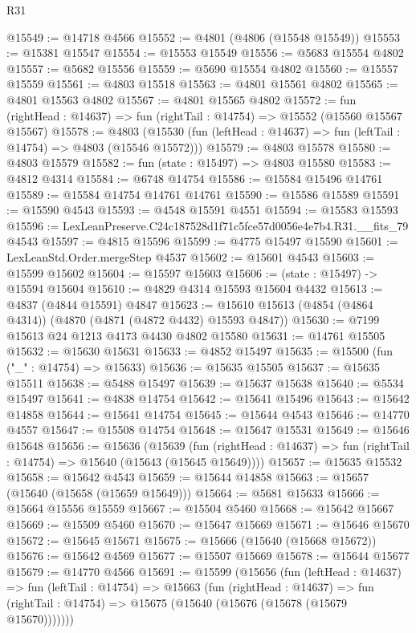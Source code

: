 \begin{lexlean}{R31}
\begin{coremodule}
@15549 := @14718 @4566
@15552 := @4801 (@4806 (@15548 @15549))
@15553 := @15381 @15547
@15554 := @15553 @15549
@15556 := @5683 @15554 @4802
@15557 := @5682 @15556
@15559 := @5690 @15554 @4802
@15560 := @15557 @15559
@15561 := @4803 @15518
@15563 := @4801 @15561 @4802
@15565 := @4801 @15563 @4802
@15567 := @4801 @15565 @4802
@15572 := fun (rightHead : @14637) => fun (rightTail : @14754) => @15552 (@15560 @15567 @15567)
@15578 := @4803
    (@15530 (fun (leftHead : @14637) => fun (leftTail : @14754) => @4803 (@15546 @15572)))
@15579 := @4803 @15578
@15580 := @4803 @15579
@15582 := fun (state : @15497) => @4803 @15580
@15583 := @4812 @4314
@15584 := @6748 @14754
@15586 := @15584 @15496 @14761
@15589 := @15584 @14754 @14761 @14761
@15590 := @15586 @15589
@15591 := @15590 @4543
@15593 := @4548 @15591 @4551
@15594 := @15583 @15593
@15596 := LexLeanPreserve.C24c187528d1f71c5fce57d0056e4e7b4.R31.__fits_79 @4543
@15597 := @4815 @15596
@15599 := @4775 @15497 @15590
@15601 := LexLeanStd.Order.mergeStep @4537
@15602 := @15601 @4543
@15603 := @15599 @15602
@15604 := @15597 @15603
@15606 := (state : @15497) -> @15594 @15604
@15610 := @4829 @4314 @15593 @15604 @4432
@15613 := @4837 (@4844 @15591) @4847
@15623 := @15610 @15613 (@4854 (@4864 @4314)) (@4870 (@4871 (@4872 @4432) @15593 @4847))
@15630 := @7199 @15613 @24 @1213 @4173 @4430 @4802 @15580
@15631 := @14761 @15505
@15632 := @15630 @15631
@15633 := @4852 @15497
@15635 := @15500 (fun ("_" : @14754) => @15633)
@15636 := @15635 @15505
@15637 := @15635 @15511
@15638 := @5488 @15497
@15639 := @15637 @15638
@15640 := @5534 @15497
@15641 := @4838 @14754
@15642 := @15641 @15496
@15643 := @15642 @14858
@15644 := @15641 @14754
@15645 := @15644 @4543
@15646 := @14770 @4557
@15647 := @15508 @14754
@15648 := @15647 @15531
@15649 := @15646 @15648
@15656 := @15636
    (@15639
      (fun (rightHead : @14637) => fun (rightTail : @14754) => @15640 (@15643 (@15645 @15649))))
@15657 := @15635 @15532
@15658 := @15642 @4543
@15659 := @15644 @14858
@15663 := @15657 (@15640 (@15658 (@15659 @15649)))
@15664 := @5681 @15633
@15666 := @15664 @15556 @15559
@15667 := @15504 @5460
@15668 := @15642 @15667
@15669 := @15509 @5460
@15670 := @15647 @15669
@15671 := @15646 @15670
@15672 := @15645 @15671
@15675 := @15666 (@15640 (@15668 @15672))
@15676 := @15642 @4569
@15677 := @15507 @15669
@15678 := @15644 @15677
@15679 := @14770 @4566
@15691 := @15599
    (@15656
      (fun (leftHead : @14637) =>
      fun (leftTail : @14754) =>
      @15663
        (fun (rightHead : @14637) =>
        fun (rightTail : @14754) => @15675 (@15640 (@15676 (@15678 (@15679 @15670)))))))

\end{coremodule}
\end{lexlean}
